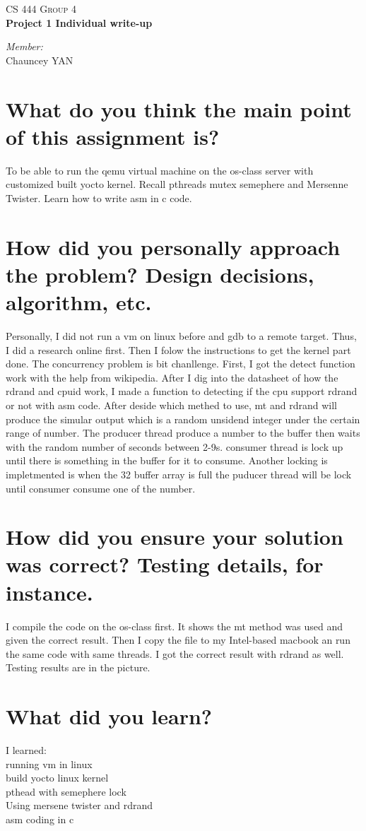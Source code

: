 \documentclass[letterpaper,10pt]{article}
\begin{document}

\begin{center}
\textsc{\LARGE CS 444 Group 4}\\

{ \huge \bfseries Project 1 Individual write-up\\}

\emph{Member:}\\
Chauncey \textsc{YAN}
\end{center}

\section{What do you think the main point of this assignment is?}
To be able to run the qemu virtual machine on the os-class server with customized built yocto kernel. Recall pthreads mutex semephere and Mersenne Twister. Learn how to write asm in c code.
\section{How did you personally approach the problem? Design decisions, algorithm, etc.}
Personally, I did not run a vm on linux before and gdb to a remote target. Thus, I did a research online first. Then I folow the instructions to get the kernel part done. The concurrency problem is bit chanllenge. First, I got the detect function work with the help from wikipedia. After I dig into the datasheet of how the rdrand and cpuid work, I made a function to detecting if the cpu support rdrand or not with asm code. After deside which methed to use, mt and rdrand will produce the simular output which is a random unsidend integer under the certain range of number. The producer thread produce a number to the buffer then waits with the random number of seconds between 2-9s. consumer thread is lock up until there is something in the buffer for it to consume. Another locking is impletmented is when the 32 buffer array is full the puducer thread will be lock until consumer consume one of the number.
\section{How did you ensure your solution was correct? Testing details, for instance.} I compile the code on the os-class first. It shows the mt method was used and given the correct result. Then I copy the file to my Intel-based macbook an run the same code with same threads. I got the correct result with rdrand as well. Testing results are in the picture.


\section{What did you learn?}
I learned: \\
running vm in linux\\
build yocto linux kernel\\
pthead with semephere lock\\
Using mersene twister and rdrand\\
asm coding in c\\
\end{document}
